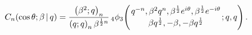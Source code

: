 \[\mathop{C_{n}\/}\nolimits\!\left(\mathop{\cos\/}\nolimits\theta;\beta\,|\,q%
\right)=\frac{\left(\beta^{2};q\right)_{n}}{\left(q;q\right)_{n}\beta^{\frac{1%
}{2}n}}\mathop{{{}_{4}\phi_{3}}\/}\nolimits\!\left({q^{-n},\beta^{2}q^{n},%
\beta^{\frac{1}{2}}e^{i\theta},\beta^{\frac{1}{2}}e^{-i\theta}\atop\beta q^{%
\frac{1}{2}},-\beta,-\beta q^{\frac{1}{2}}};q,q\right).\]